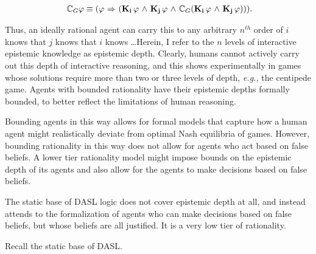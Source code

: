\begin{eqnarray}~\label{common_knowledge}
	\mathbb{C}_{G}\varphi \equiv (\varphi {\ \Rightarrow \ } (\mathbf{K}_{\mathbf{i}}\,\varphi {\ \wedge \ } \mathbf{K}_{\mathbf{j}}\,\varphi {\ \wedge \ } \mathbb{C}_{G}(\mathbf{K}_{\mathbf{i}}\,\varphi {\ \wedge \ } \mathbf{K}_{\mathbf{j}}\,\varphi))).
\end{eqnarray}

Thus, an ideally rational agent can carry this to any arbitrary $\mathit{n^{th}}$ order of $i$ knows that $j$ knows that $i$ knows \dots Herein, I refer to the $n$ levels of interactive epistemic knowledge as epistemic depth. Clearly, humans cannot actively carry out this depth of interactive reasoning, and this shows experimentally in games whose solutions require more than two or three levels of depth, \emph{e.g.,} the centipede game. Agents with bounded rationality have their epistemic depths formally bounded, to better reflect the limitations of human reasoning.

Bounding agents in this way allows for formal models that capture how a human agent might realistically deviate from optimal Nash equilibria of games. However, bounding rationality in this way does not allow for agents who act based on false beliefs. A lower tier rationality model might impose bounds on the epistemic depth of its agents and also allow for the agents to make decisions based on false beliefs.

The static base of DASL logic does not cover epistemic depth at all, and instead attends to the formalization of agents who can make decisions based on false beliefs, but whose beliefs are all justified. It is a very low tier of rationality.

Recall the static base of DASL.

